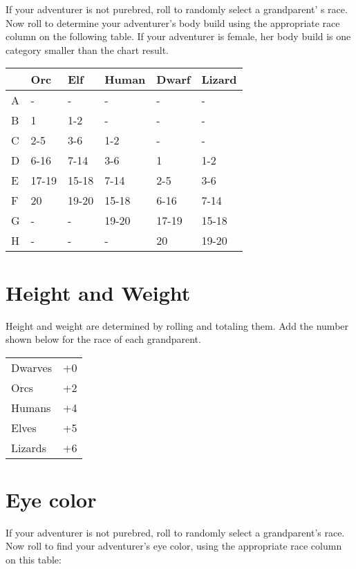 \begin{multicols*}{2}
\normalsize
If your adventurer is not purebred, roll  to randomly select a grandparent' s race. Now roll  to determine your adventurer's body build using the appropriate race column on the following table. If your adventurer is female, her body build is one category smaller than the chart result.
\vspace{-5pt}
\begin{normbox}[Body Build]
\begin{tabular}{@{} l l l l l l }
\tiny
 & Orc & Elf & Human & Dwarf & Lizard\\
\midrule
\small
A & - & - & - & - & -\\
B & 1 & 1-2 & - & - & -\\
C & 2-5 & 3-6 & 1-2 & - & -\\
D & 6-16 & 7-14 & 3-6 & 1 & 1-2\\
E & 17-19 & 15-18 & 7-14 & 2-5 & 3-6\\
F & 20 & 19-20 & 15-18 & 6-16 & 7-14\\
G & - & - & 19-20 & 17-19 & 15-18\\
H & - & - & - & 20 & 19-20\\
\end{tabular}
\end{normbox}
\section{Height and Weight}
\begin{multicols*}{2}
Height and weight are determined by rolling  and totaling them. Add the number shown below for the race of each grandparent.
\begin{normbox}
\begin{tabular}{l l}
\small
Dwarves & +0\\
Orcs & +2\\
Humans & +4\\
Elves & +5\\
Lizards & +6\\
\end{tabular}
\end{normbox}
\normalsize
\end{multicols*}
\section{Eye color}
If your adventurer is not purebred, roll  to randomly select a grandparent's race. Now roll  to find your adventurer's eye color, using the appropriate race column on this table:


\end{multicols*}
